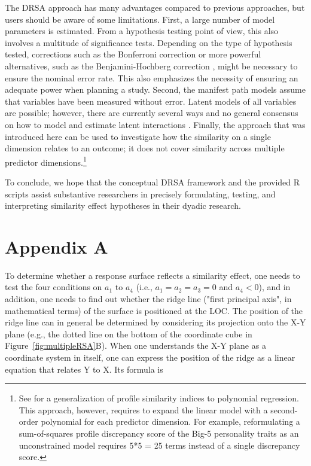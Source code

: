\documentclass[jou,a4paper,draftfirst]{apa6}
\begin{document}
The DRSA approach has many advantages compared to previous approaches, but users should be aware of some limitations. First, a large number of model parameters is estimated. From a hypothesis testing point of view, this also involves a multitude of significance tests. Depending on the type of hypothesis tested, corrections such as the Bonferroni correction \parencite{bonferroni_il_1935} or more powerful alternatives, such as the Benjamini-Hochberg correction \parencite{benjamini_controlling_1995}, might be necessary to ensure the nominal error rate. This also emphasizes the necessity of ensuring an adequate power when planning a study.
Second, the manifest path models assume that variables have been measured without error. Latent models of all variables are possible; however, there are currently several ways and no general consensus on how to model and estimate latent interactions \parencite[e.g.,][]{harring_comparison_2012}.
Finally, the approach that was introduced here can be used to investigate how the similarity on a single dimension relates to an outcome; it does not cover similarity across multiple predictor dimensions.\footnote{See \textcite{edwards_study_1994} for a generalization of profile similarity indices to polynomial regression. This approach, however, requires to expand the linear model with a second-order polynomial for each predictor dimension. For example, reformulating a sum-of-squares profile discrepancy score of the Big-5 personality traits as an unconstrained model requires 5*5 = 25 terms instead of a single discrepancy score.}

To conclude, we hope that the conceptual DRSA framework and the provided R scripts assist substantive researchers in precisely formulating, testing, and interpreting similarity effect hypotheses in their dyadic research.

\printbibliography


\section{Appendix A}

To determine whether a response surface reflects a similarity effect, one needs to test the four conditions on $a_1$ to $a_4$ (i.e., $a_1 = a_2 = a_3 = 0$ and $a_4 < 0$), and in addition, one needs to find out whether the ridge line ("first principal axis", in mathematical terms) of the surface is positioned at the LOC. The position of the ridge line can in general be determined by considering its projection onto the X-Y plane (e.g., the dotted line on the bottom of the coordinate cube in Figure~\ref{fig:multipleRSA}B). When one understands the X-Y plane as a coordinate system in itself, one can express the position of the ridge as a linear equation that relates Y to X. Its formula is \parencite[see][]{Edwards2007}
\end{document}
